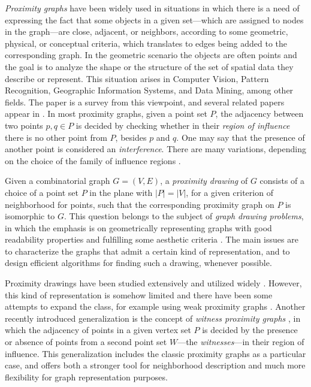 \documentclass{llncs}
\begin{document}
\emph{Proximity graphs} have been widely used in situations in which there is a need of expressing the fact that some objects in a given set---which are
assigned to nodes in the graph---are close, adjacent, or neighbors, according to some geometric, physical, or conceptual
criteria, which translates to edges being added to the corresponding graph.
In the geometric scenario the objects are often points and the goal is to analyze the shape or the structure of the set of spatial data they describe or represent. This situation arises in Computer Vision, Pattern Recognition, Geographic Information Systems, and Data Mining, among other fields. The paper \cite{JT92} is a survey from this viewpoint, and several related papers appear in \cite{T88}. In most proximity graphs, given a point set $P$, the adjacency between two points $p,q\in P$ is decided by checking
whether in their \emph{region of influence} there is no
other point from $P$, besides $p$ and $q$. One may say that the presence of another point
is considered an \emph{interference}. There are many variations,
depending on the choice of the family of influence regions \cite{JT92,Co06,Li08}.



Given a combinatorial graph $G=(V,E)$, a \emph{proximity drawing} of $G$ consists of
a choice of a point set $P$ in the plane with $|P|=|V|$, for a given criterion of neighborhood
for points, such that the corresponding proximity graph on $P$ is
isomorphic to $G$.  This question
belongs to the subject of \emph{graph drawing problems}, in which the emphasis is on geometrically representing graphs
with good readability properties and fulfilling some aesthetic criteria \cite{BETT98}. The main issues are to characterize the graphs that admit a certain kind of representation, and to design efficient algorithms for finding such a drawing,
whenever possible.

Proximity drawings have been studied extensively and utilized widely \cite{BLL94,Li08}. However, this  kind of representation is
somehow limited and there have been some attempts to expand the class, for example using weak proximity graphs \cite{BLW06}.
Another recently introduced generalization is the
concept of \emph{witness proximity graphs} \cite{ADH,ADH08}, in which the adjacency of points in a
given vertex set $P$ is decided by the presence or
absence of points from a second
point set $W$---the \emph{witnesses}---in their region of
influence. This generalization includes the classic proximity graphs
as a particular case,
and offers both a stronger tool for neighborhood description and much more flexibility for graph representation purposes.
\end{document}
